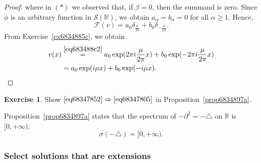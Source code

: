 \documentclass[a4paper,9pt]{amsart}
\newcommand{\scr}[1]{\mathscr{#1}}
\newcommand{\R}{\mathbb{R}}	%
\newcommand{\de}{\partial}		%
\newcommand{\THEN}{\Rightarrow}	%
\newcommand{\laplacian}{\triangle}
\theoremstyle{plain}
\theoremstyle{definition}
\newtheorem{exercise}[proposition]{Exercise}%
\theoremstyle{remark}
\begin{document}
\begin{proof}
	where in $(*)$ we observed that, if $\beta=0$, then the summand is zero.
	Since $\phi$ is an arbitrary function in $\scr S(\R)$, we obtain $a_\alpha=b_\alpha=0$ for all $\alpha\ge1$.
	Hence,
	\begin{equation}
		\scr F(v) = a_0 \delta_{\frac{\mu}{2\pi}} + b_0 \delta_{-\frac{\mu}{2\pi}} .
	\end{equation}
	From Exercise~\ref{ex6834885c}, we obtain
	\begin{align}
		v(x) 
		&\overset{\eqref{eq683488c2}}= a_0 \exp(2\pi i\frac{\mu}{2\pi} x)  + b_0 \exp(-2\pi i\frac{\mu}{2\pi} x) \\
		&= a_0 \exp(i\mu x)  + b_0 \exp(-i\mu x) .
	\end{align}
\end{proof}

\begin{exercise}\label{ex68347888}
	Show $\eqref{eq68347852}\THEN\eqref{eq68347805}$ in Proposition~\ref{prop6834897a}.
\end{exercise}

Proposition~\ref{prop6834897a} states that the spectrum of $-\de^2=-\laplacian$ on $\R$ is $[0,+\infty)$:
\begin{equation}
	\sigma(-\laplacian) = [0,+\infty) .
\end{equation}

\subsubsection{Select solutions that are extensions}
\end{document}
